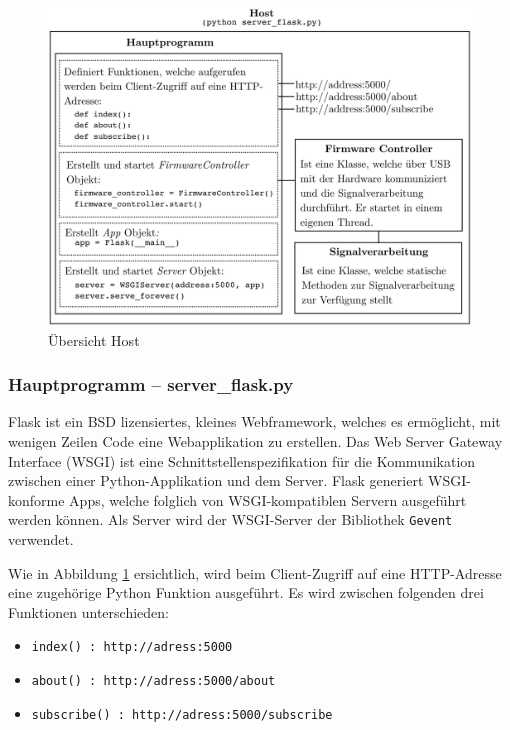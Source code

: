 \begin{figure}[htb]
\begin{center}
\includegraphics[width=\textwidth]{graphics/image_software_host_schema.png}
\end{center}
\caption{Übersicht Host} %
\label{fig:image_software_host_schema}
\end{figure}
%


\clearpage
\subsubsection{Hauptprogramm -- server\_flask.py}\label{sec:hauptprogramm}
Flask ist ein BSD lizensiertes, kleines Webframework, welches es ermöglicht, mit wenigen Zeilen Code eine Webapplikation zu erstellen. Das Web Server Gateway Interface (WSGI) ist eine Schnittstellenspezifikation für die Kommunikation zwischen einer Python-Applikation und dem Server. Flask generiert WSGI-konforme Apps, welche folglich von WSGI-kompatiblen Servern ausgeführt werden können. Als Server wird der WSGI-Server der Bibliothek \texttt{Gevent} verwendet.

Wie in Abbildung \ref{fig:image_software_host_schema} ersichtlich, wird beim Client-Zugriff auf eine HTTP-Adresse eine zugehörige Python Funktion ausgeführt. Es wird zwischen folgenden drei Funktionen unterschieden:

\begin{itemize}
	\item \texttt{index() : http://adress:5000}
	\item \texttt{about()  : http://adress:5000/about}
	\item \texttt{subscribe() : http://adress:5000/subscribe}
\end{itemize}

